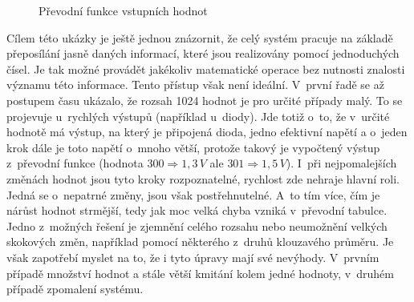 \begin{figure}[h]
	\caption{Převodní funkce vstupních hodnot}
\end{figure}

Cílem této ukázky je ještě jednou znázornit, že celý systém pracuje na základě přeposílání jasně daných informací, které jsou realizovány pomocí jednoduchých čísel. Je tak možné provádět jakékoliv matematické operace bez nutnosti znalosti významu této informace. Tento přístup však není i\-de\-ál\-ní. V~první řadě se až postupem času ukázalo, že rozsah 1024 hodnot je pro určité případy malý. To se projevuje u~rychlých výstupů (například u~diody). Jde totiž o~to, že v~určité hodnotě má výstup, na který je připojená dioda, jedno efektivní napětí a o~jeden krok dále je toto napětí o~mnoho větší, protože takový je vypočtený výstup z~převodní funkce (hodnota $300 \Rightarrow 1,3\,V$ ale $301 \Rightarrow 1,5\,V$). I~při nejpomalejších změnách hodnot jsou tyto kroky rozpoznatelné, rychlost zde nehraje hlavní roli. Jedná se o~nepatrné změny, jsou však postřehnutelné. A~to tím více, čím je nárůst hodnot strmější, tedy jak moc velká chyba vzniká v~převodní tabulce. Jedno z~možných řešení je zjemnění celého rozsahu nebo neumožnění velkých skokových změn, například pomocí některého z~druhů klouzavého průměru. Je však zapotřebí myslet na to, že i tyto úpravy mají své nevýhody. V~prvním případě množství hodnot a stále větší kmitání kolem jedné hodnoty, v~druhém případě zpomalení systému.

